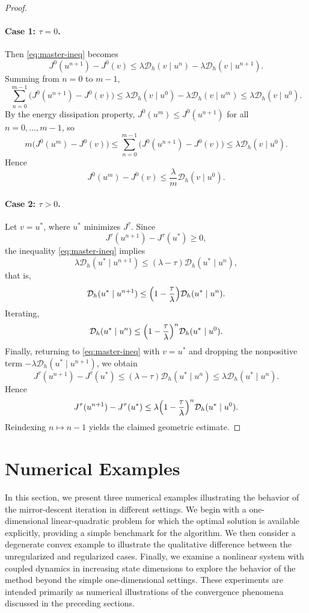 \documentclass[11pt]{amsart}
\theoremstyle{plain}
\theoremstyle{definition}
\theoremstyle{remark}
\begin{document}
\begin{proof}
\paragraph{Case 1: \texorpdfstring{$\tau=0$}{tau=0}.}
Then \eqref{eq:master-ineq} becomes
\[
J^0(u^{n+1})-J^0(v)
\le
\lambda \mathcal{D}_h(v\mid u^n)-\lambda \mathcal{D}_h(v\mid u^{n+1}).
\]
Summing from $n=0$ to $m-1$,
\[
\sum_{n=0}^{m-1}\bigl(J^0(u^{n+1})-J^0(v)\bigr)
\le
\lambda \mathcal{D}_h(v\mid u^0)-\lambda \mathcal{D}_h(v\mid u^m)
\le
\lambda \mathcal{D}_h(v\mid u^0).
\]
By the energy dissipation property, $J^0(u^m)\le J^0(u^{n+1})$ for all $n=0,\dots,m-1$, so
\[
m\bigl(J^0(u^m)-J^0(v)\bigr)
\le
\sum_{n=0}^{m-1}\bigl(J^0(u^{n+1})-J^0(v)\bigr)
\le
\lambda \mathcal{D}_h(v\mid u^0).
\]
Hence
\[
J^0(u^m)-J^0(v)\le \frac{\lambda}{m}\mathcal{D}_h(v\mid u^0).
\]

\paragraph{Case 2: \texorpdfstring{$\tau>0$}{tau>0}.}
Let $v=u^\ast$, where $u^\ast$ minimizes $J^\tau$. Since
\[
J^\tau(u^{n+1})-J^\tau(u^\ast)\ge 0,
\]
the inequality \eqref{eq:master-ineq} implies
\[
\lambda \mathcal{D}_h(u^\ast\mid u^{n+1})
\le
(\lambda-\tau)\mathcal{D}_h(u^\ast\mid u^n),
\]
that is,
\[
\mathcal{D}_h(u^\ast\mid u^{n+1})
\le
\Bigl(1-\frac{\tau}{\lambda}\Bigr)\mathcal{D}_h(u^\ast\mid u^n).
\]
Iterating,
\[
\mathcal{D}_h(u^\ast\mid u^n)
\le
\Bigl(1-\frac{\tau}{\lambda}\Bigr)^n \mathcal{D}_h(u^\ast\mid u^0).
\]
Finally, returning to \eqref{eq:master-ineq} with $v=u^\ast$ and dropping the nonpositive term
$-\lambda \mathcal{D}_h(u^\ast\mid u^{n+1})$, we obtain
\[
J^\tau(u^{n+1})-J^\tau(u^\ast)
\le
(\lambda-\tau)\mathcal{D}_h(u^\ast\mid u^n)
\le
\lambda \mathcal{D}_h(u^\ast\mid u^n).
\]
Hence
\[
J^\tau(u^{n+1})-J^\tau(u^\ast)
\le
\lambda \Bigl(1-\frac{\tau}{\lambda}\Bigr)^n \mathcal{D}_h(u^\ast\mid u^0).
\]
Reindexing $n\mapsto n-1$ yields the claimed geometric estimate.
\end{proof}

\section{Numerical Examples}\label{sec:numerics}

In this section, we present three numerical examples illustrating the behavior of the mirror-descent iteration in different settings. We begin with a one-dimensional linear-quadratic problem for which the optimal solution is available explicitly, providing a simple benchmark for the algorithm. We then consider a degenerate convex example to illustrate the qualitative difference between the unregularized and regularized cases. Finally, we examine a nonlinear system with coupled dynamics in increasing state dimensions to explore the behavior of the method beyond the simple one-dimensional settings. These experiments are intended primarily as numerical illustrations of the convergence phenomena discussed in the preceding sections.
\end{document}
